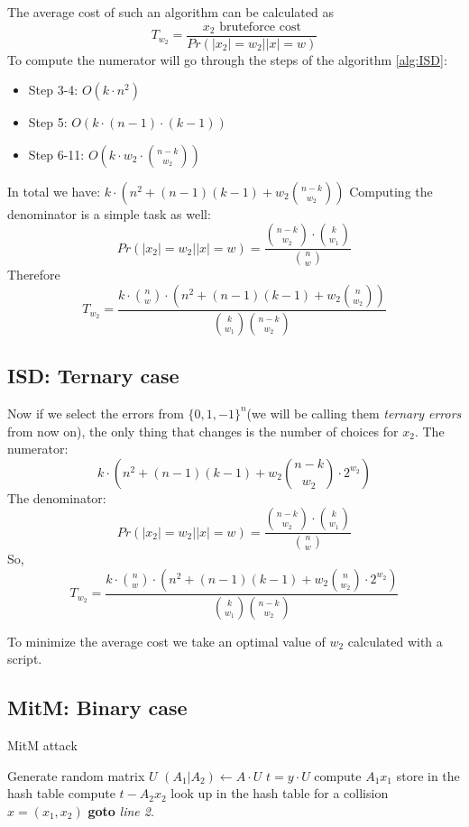 \documentclass[12pt]{article}
\begin{document}
The average cost of such an algorithm can be calculated as
\[
T_{w_{2}} = \frac{x_2\text{ bruteforce cost}}{Pr(|x_2| = w_2||x| = w)}
\]
To compute the numerator will go through the steps of the algorithm \ref{alg:ISD}:
\begin{itemize}
    \item Step 3-4: $O(k\cdot n^2)$
    \item Step 5: $O(k \cdot (n-1) \cdot (k-1))$
    \item Step 6-11: $O(k \cdot w_2 \cdot \binom{n-k}{w_2})$
\end{itemize}
In total we have: $k \cdot (n^2 + (n-1)(k-1) + w_2\binom{n-k}{w_2})$
Computing the denominator is a simple task as well:
\[
    Pr(|x_2| = w_2||x| = w) = \frac{\binom{n-k}{w_2} \cdot \binom{k}{w_1}}{\binom{n}{w}}
\]
Therefore
\[
T_{w_{2}} = \frac{k\cdot\binom{n}{w}\cdot(n^2 + (n-1)(k-1) + w_2\binom{n}{w_2})}{\binom{k}{w_1}\binom{n-k}{w_2}}
\]
\subsection{ISD: Ternary case}
Now if we select the errors from $\{0,1,-1\}^{n}$(we will be calling them \textit{ternary errors} from now on), the only thing that changes is the number of choices for $x_2$.
The numerator:
\[
    k\cdot(n^2 + (n-1)(k-1) + w_2\binom{n-k}{w_2}\cdot2^{w_2})
\]
The denominator:
\[
    Pr(|x_2| = w_2||x| = w) = \frac{\binom{n-k}{w_2} \cdot \binom{k}{w_1}}{\binom{n}{w}}
\]
So,
\[
T_{w_{2}} = \frac{k\cdot\binom{n}{w}\cdot(n^2 + (n-1)(k-1) + w_2\binom{n}{w_2}\cdot2^{w_2})}{\binom{k}{w_1}\binom{n-k}{w_2}}
\]

To minimize the average cost we take an optimal value of $w_2$ calculated with a script.

\subsection{MitM: Binary case}

\begin{algorithm}
\caption{MitM attack}\label{alg:MitM}
\begin{algorithmic}[1]
    \State Generate random matrix $U$
    \State $(A_1|A_2) \gets A \cdot U$
    \State $t = y \cdot U$
    \State compute $A_1x_1$
    \State store in the hash table
    \EndFor
    \State compute $t - A_2x_2$
    \State look up in the hash table for a collision
        \State \Return $x = (x_1, x_2)$
    \EndIf
    \EndFor
\State \textbf{goto} \emph{line 2}.
\EndProcedure
\end{algorithmic}
\end{algorithm}
\end{document}
